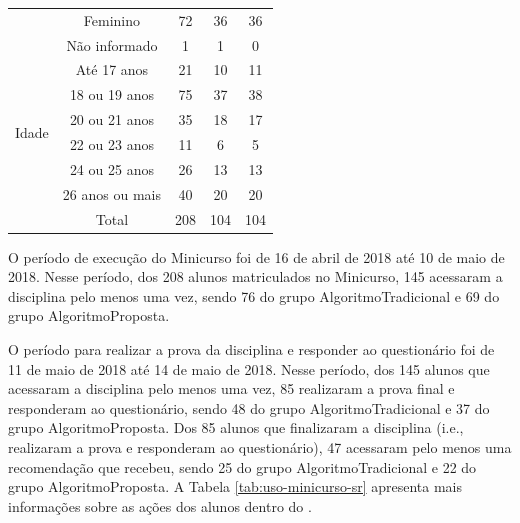 \begin{table}[h]
\begin{tabular}{|c|c|c|c|c|}
                                        & Feminino         & 72                                  & 36                   & 36                               \\
                                        & Não informado    & 1                                   & 1                    & 0                                \\ \hline
  \multirow{6}{*}{Idade}                & Até 17 anos      & 21                                  & 10                   & 11                               \\
                                        & 18 ou 19 anos    & 75                                  & 37                   & 38                               \\
                                        & 20 ou 21 anos    & 35                                  & 18                   & 17                               \\
                                        & 22 ou 23 anos    & 11                                  & 6                    & 5                                \\
                                        & 24 ou 25 anos    & 26                                  & 13                   & 13                               \\
                                        & 26 anos ou mais  & 40                                  & 20                   & 20                               \\ \hline
                                        & Total            & 208                                 & 104                  & 104                              \\ \hline
\end{tabular}
\end{table}

O período de execução do Minicurso foi de 16 de abril de 2018 até 10 de maio de 2018. Nesse período, dos 208 alunos
matriculados no Minicurso, 145 acessaram a disciplina pelo menos uma vez, sendo 76 do grupo AlgoritmoTradicional e 69
do grupo AlgoritmoProposta.

O período para realizar a prova da disciplina e responder ao questionário foi de 11 de maio de 2018 até
14 de maio de 2018. Nesse período, dos 145 alunos que acessaram a disciplina pelo menos uma vez, 85 realizaram a prova final e responderam ao
questionário, sendo 48 do grupo AlgoritmoTradicional e 37 do grupo AlgoritmoProposta. Dos 85 alunos que finalizaram a
disciplina (i.e., realizaram a prova e responderam ao questionário), 47 acessaram pelo menos uma recomendação que
recebeu, sendo 25 do grupo AlgoritmoTradicional e 22 do grupo AlgoritmoProposta. A Tabela \ref{tab:uso-minicurso-sr}
apresenta mais informações sobre as ações dos alunos dentro do \adaptweb.


